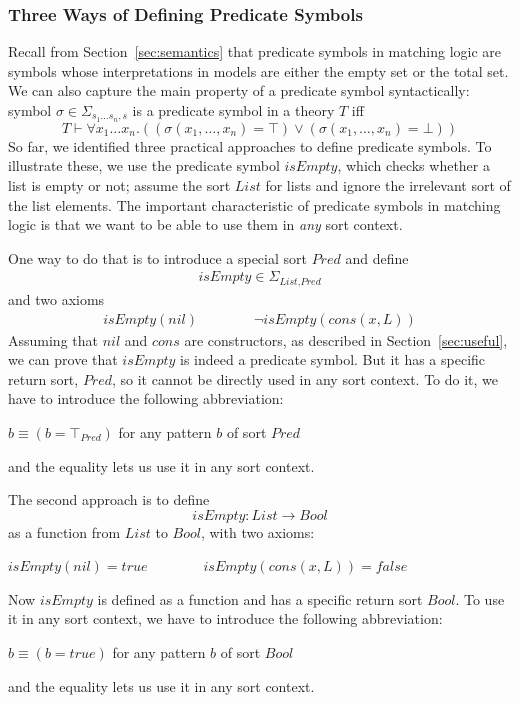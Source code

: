 \documentclass[UTF8,11pt]{article}
\theoremstyle{plain}
\theoremstyle{definition}
\theoremstyle{remark}
\newcommand{\Bool}{\textit{Bool}}
\newcommand{\List}{\textit{List}}
\newcommand{\nil}{\textit{nil}}
\newcommand{\cons}{\textit{cons}}
\newcommand{\ittrue}{\textit{true}}
\newcommand{\itfalse}{\textit{false}}
\newcommand{\Pred}{\textit{Pred}}
\newcommand{\isEmpty}{\textit{isEmpty}}
\begin{document}
\subsubsection{Three Ways of Defining Predicate Symbols}
\label{sec:three-ways-of-defining-predicate-symbols}
Recall from Section~\ref{sec:semantics} that predicate symbols in
matching logic are symbols whose interpretations in models are either the
empty set or the total set.
We can also capture the main property of a predicate symbol syntactically:
symbol $\sigma \in \Sigma_{s_1\ldots s_n,s}$ is a predicate symbol 
in a theory $T$ iff
$$ T \vdash \forall x_1 \dots x_n . ((\sigma(x_1,\dots,x_n) = \top) \vee  
(\sigma(x_1,\dots,x_n) = \bot))$$
So far, we identified three practical approaches to define predicate symbols.
To illustrate these, we use the predicate symbol $\isEmpty$, which checks
whether a list is empty or not;
assume the sort $\List$ for lists and ignore the irrelevant sort of the list
elements.
The important characteristic of predicate symbols in matching logic is that
we want to be able to use them in \emph{any} sort context.

One way to do that is to introduce a special sort $\Pred$ and define
\begin{align*}
 \isEmpty \in \Sigma_{\List,\Pred}
\end{align*}
and two axioms
\begin{align*}
\isEmpty(\nil) \qquad\qquad \neg \isEmpty(\cons(x,L))
\end{align*}
Assuming that $\nil$ and $\cons$ are constructors, as described in
Section~\ref{sec:useful}, we can prove that $\isEmpty$ is indeed a
predicate symbol.
But it has a specific return sort, $\Pred$, so it cannot be directly used
in any sort context.
To do it, we have to introduce the following abbreviation:
\begin{center}
	$b \equiv (b = \top_\Pred)$ \qquad for any pattern $b$ of sort $\Pred$
\end{center}
and the equality lets us use it in any sort context.

The second approach is to define
$$ \isEmpty \colon \List \to \Bool $$
as a function from $\List$ to $\Bool$, with two axioms:
\begin{center}
	$isEmpty(\nil)=\ittrue \qquad\qquad \isEmpty(\cons(x,L)) = \itfalse$
\end{center}
Now $\isEmpty$ is defined as a function and has a specific return sort $\Bool$.
To use it in any sort context, we have to introduce the following abbreviation:
\begin{center}
	$b \equiv (b = \ittrue)$ \qquad for any pattern $b$ of sort $\Bool$
\end{center}
and the equality lets us use it in any sort context.
\end{document}
